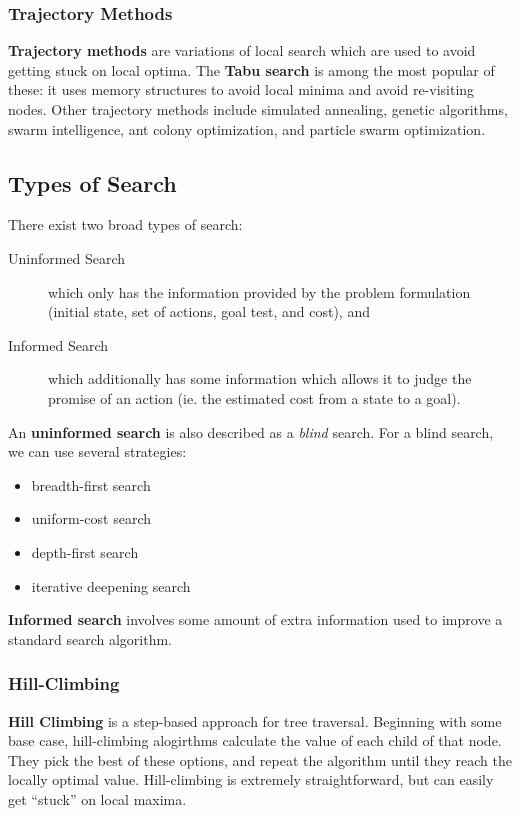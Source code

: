 \documentclass[12pt]{article}
\begin{document}
\subsubsection{Trajectory Methods}
{\bf Trajectory methods} are variations of local search which are used to avoid getting stuck on local optima. The {\bf Tabu search} is among the most popular of these: it uses memory structures to avoid local minima and avoid re-visiting nodes. Other trajectory methods include simulated annealing, genetic algorithms, swarm intelligence, ant colony optimization, and particle swarm optimization.

\subsection{Types of Search}
There exist two broad types of search:
\begin{description}
\item[Uninformed Search] which only has the information provided by the problem formulation (initial state, set of actions, goal test, and cost), and
\item[Informed Search] which additionally has some information which allows it to judge the promise of an action (ie. the estimated cost from a state to a goal).
\end{description}

An {\bf uninformed search} is also described as a {\it blind} search. For a blind search, we can use several strategies:
\begin{itemize}
\item breadth-first search
\item uniform-cost search
\item depth-first search
\item iterative deepening search
\end{itemize}

{\bf Informed search} involves some amount of extra information used to improve a standard search algorithm.

\subsubsection{Hill-Climbing}
{\bf Hill Climbing} is a step-based approach for tree traversal. Beginning with some base case, hill-climbing alogirthms calculate the value of each child of that node. They pick the best of these options, and repeat the algorithm until they reach the locally optimal value. Hill-climbing is extremely straightforward, but can easily get ``stuck'' on local maxima.
\end{document}
